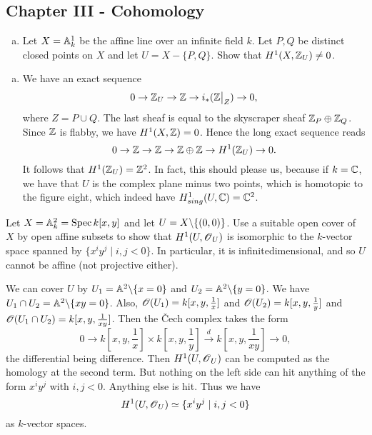 \documentclass[11pt, english]{article}
\begin{document}
\subsection{Chapter III - Cohomology}

\begin{exc}[Exercise 2.1]
  \begin{enumerate}[a)]
  \item Let $X=\mathbb{A}_k^1$ be the affine line over an infinite field $k$. Let $P,Q$ be distinct closed points on $X$ and let $U=X - \{ P,Q\}$. Show that $H^1(X,\mathbb{Z}_U)\neq 0$.
  \end{enumerate}
\end{exc}

\begin{sol}
  \begin{enumerate}[a)]
  \item We have an exact sequence
\[
0 \to \Z_U \to \Z \to i_\ast(\restr{\Z}{Z}) \to 0,
\]
where $Z=P \cup Q$. The last sheaf is equal to the skyscraper sheaf $\mathbb{Z}_P \oplus \mathbb{Z}_Q$. Since $\mathbb{Z}$ is flabby, we have $H^1(X,\mathbb{Z})=0$. Hence the long exact sequence reads 
\[
0 \to \mathbb{Z} \to \mathbb{Z} \to \mathbb{Z} \oplus \mathbb{Z} \to H^1(\mathbb{Z}_U) \to 0.
\]
It follows that $H^1(\mathbb{Z}_U)=\mathbb{Z}^2$. In fact, this should please us, because if $k=\mathbb{C}$, we have that $U$ is the complex plane minus two points, which is homotopic to the figure eight, which indeed have $H_{sing}^1(U,\mathbb{C})=\mathbb{C}^2$.
  \end{enumerate}
\end{sol}

\begin{exc}[Exercise 4.3]
Let $X= \mathbb{A}^2_k=\operatorname{Spec} k[x,y]$ and let $U = X \backslash \{(0,0)\}$. Use a suitable open cover of $X$ by open affine subsets to show that $H^1(U,\operatorname{\mathscr{O}}_U)$ is isomorphic to the $k$-vector space spanned by $\{ x^i y^j \mid i,j < 0 \}$. In particular, it is infinitedimensional, and so $U$ cannot be affine (not projective either).  
\end{exc}
\begin{sol}
We can cover $U$ by $U_1= \mathbb{A}^2 \backslash \{ x= 0\}$ and $U_2 = \mathbb{A}^2 \backslash \{ y = 0\}$. We have $U_1 \cap U_2 = \mathbb{A}^2 \backslash \{ xy=0\}$. Also, $\operatorname{\mathscr{O}}(U_1)=k[x,y,\frac 1x]$ and $\operatorname{\mathscr{O}}(U_2)=k[x,y,\frac 1y]$ and $\operatorname{\mathscr{O}}(U_1 \cap U_2) = k[x,y,\frac {1}{xy}]$. Then the \v{C}ech complex takes the form
\[
0 \to k[x,y,\frac 1x] \times k[x,y, \frac 1y] \xrightarrow{d} k[x,y,\frac{1}{xy}] \to 0,
\]
the differential being difference. Then $H^1(U,\operatorname{\mathscr{O}}_U)$ can be computed as the homology at the second term. But nothing on the left side can hit anything of the form $x^iy^j$ with $i,j < 0$. Anything else is hit. Thus we have
\[
H^1(U, \operatorname{\mathscr{O}}_U) \simeq \{ x^i y^j \mid i,j < 0 \}
\]
as $k$-vector spaces.
\end{sol}
\end{document}
